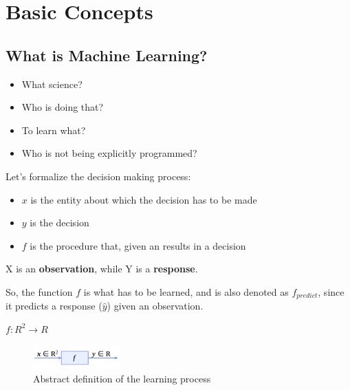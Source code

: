 

\chapter{Basic Concepts}

\section*{What is Machine Learning?}


\begin{itemize}
    \item What science?
    \item Who is doing that?
    \item To learn what?
    \item Who is not being explicitly programmed?
\end{itemize}

Let's formalize the decision making process:

\begin{multicols}{2}
    \centering

    \columnbreak

    \begin{itemize}
        \item $x$ is the entity about which the decision has to be made
        \item $y$ is the decision
        \item $f$ is the procedure that, given an  results in a decision 
    \end{itemize}

\end{multicols}

X is an \textbf{observation}, while Y is a \textbf{response}.

So, the function $f$ is what has to be learned, and is also denoted as $f_{predict}$, since it predicts a response ($\hat{y}$) given an observation.

\begin{center}
$f: R^2 \to R$
\end{center}

\begin{figure}[H]
    \centering
    \includegraphics[width=0.3\textwidth]{assets/fig1.png}
    \caption{Abstract definition of the learning process}
    \label{fig:ML1}
\end{figure}


